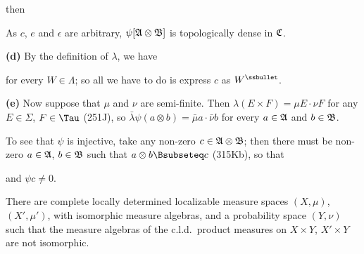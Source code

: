 {

\noindent then


\noindent As $c$, $e$ and $\epsilon$ are arbitrary,
$\psi[\frak A\otimes\frak B]$ is topologically dense in $\frak C$.

\medskip

{\bf (d)} By the definition of $\lambda$, we have


\noindent for every $W\in\Lambda$;   so all we have to do is express $c$
as $W^{\ssbullet}$.

\medskip

{\bf (e)} Now suppose that $\mu$ and $\nu$ are semi-finite.   Then
$\lambda(E\times F)=\mu E\cdot\nu F$
for any $E\in\Sigma$, $F\in\Tau$ (251J), so
$\bar\lambda\psi(a\otimes b)=\bar\mu a\cdot\bar\nu b$ for every
$a\in\frak A$ and $b\in\frak B$.

To see that $\psi$ is injective, take any non-zero
$c\in\frak A\otimes\frak B$;  then there must be non-zero $a\in\frak A$,
$b\in\frak B$ such that $a\otimes b\Bsubseteq c$ (315Kb), so that


\noindent and $\psi c\ne 0$.
}%

 There are complete locally determined
localizable measure spaces $(X,\mu)$, $(X',\mu')$, with isomorphic
measure algebras, and a probability space $(Y,\nu)$ such that the
measure algebras of the c.l.d.\ product measures on $X\times Y$,
$X'\times Y$ are not isomorphic.

